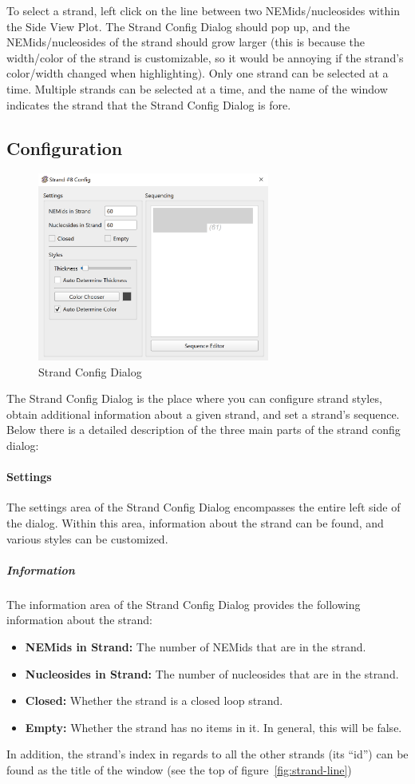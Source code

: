 \documentclass[titlepage]{article}
\begin{document}
To select a strand, left click on the line between two NEMids/nucleosides within the Side View Plot. The Strand Config Dialog should pop up, and the NEMids/nucleosides of the strand should grow larger (this is because the width/color of the strand is customizable, so it would be annoying if the strand's color/width changed when highlighting). Only one strand can be selected at a time. Multiple strands can be selected at a time, and the name of the window indicates the strand that the Strand Config Dialog is fore.

\subsection{Configuration}

\begin{figure}[h] \label{fig:strand-config-dialog}
	\centering
	\includegraphics[width=3in]{strand-config.png}
	\caption{Strand Config Dialog}
\end{figure}

The Strand Config Dialog is the place where you can configure strand styles, obtain additional information about a given strand, and set a strand's sequence. Below there is a detailed description of the three main parts of the strand config dialog:

\paragraph{Settings}
The settings area of the Strand Config Dialog encompasses the entire left side of the dialog. Within this area, information about the strand can be found, and various styles can be customized.

\subparagraph{Information}
The information area of the Strand Config Dialog provides the following information about the strand:
\begin{itemize}
	\item \textbf{NEMids in Strand:} The number of NEMids that are in the strand.
	\item \textbf{Nucleosides in Strand:} The number of nucleosides that are in the strand.
	\item \textbf{Closed:} Whether the strand is a closed loop strand.
	\item \textbf{Empty:} Whether the strand has no items in it. In general, this will be false.
\end{itemize} 
In addition, the strand's index in regards to all the other strands (its ``id'') can be found as the title of the window (see the top of figure~\ref{fig:strand-line})
\end{document}
